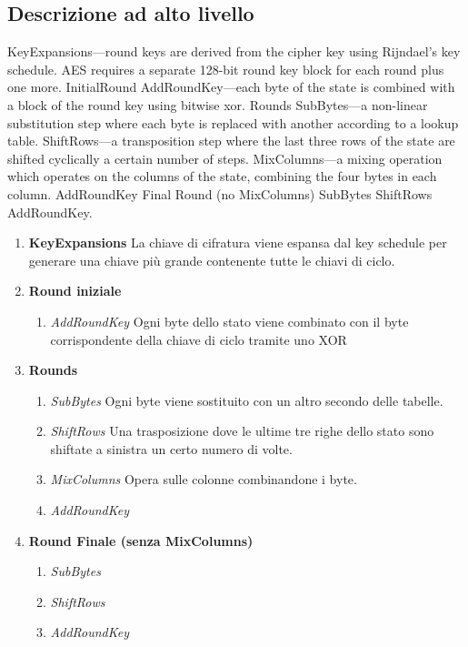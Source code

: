 \subsection{Descrizione ad alto livello}
KeyExpansions—round keys are derived from the cipher key using Rijndael's key schedule. AES requires a separate 128-bit round key block for each round plus one more.
InitialRound
AddRoundKey—each byte of the state is combined with a block of the round key using bitwise xor.
Rounds
SubBytes—a non-linear substitution step where each byte is replaced with another according to a lookup table.
ShiftRows—a transposition step where the last three rows of the state are shifted cyclically a certain number of steps.
MixColumns—a mixing operation which operates on the columns of the state, combining the four bytes in each column.
AddRoundKey
Final Round (no MixColumns)
SubBytes
ShiftRows
AddRoundKey.

\begin{enumerate}
\item \textbf{KeyExpansions} La chiave di cifratura viene espansa dal key schedule per generare una chiave più grande contenente tutte le chiavi di ciclo.
\item \textbf{Round iniziale}
\begin{enumerate}
\item \textit{AddRoundKey} Ogni byte dello stato viene combinato con il byte corrispondente della chiave di ciclo tramite uno XOR
\end{enumerate}
\item \textbf{Rounds}
\begin{enumerate}
\item \textit{SubBytes} Ogni byte viene sostituito con un altro secondo delle tabelle.
\item \textit{ShiftRows} Una trasposizione dove le ultime tre righe dello stato sono shiftate a sinistra un certo numero di volte.
\item \textit{MixColumns} Opera sulle colonne combinandone i byte.
\item \textit{AddRoundKey}
\end{enumerate}
\item \textbf{Round Finale (senza MixColumns)}
\begin{enumerate}
\item \textit{SubBytes}
\item \textit{ShiftRows}
\item \textit{AddRoundKey}
\end{enumerate}
\end{enumerate}




